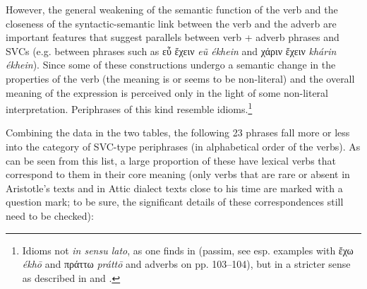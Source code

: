 \documentclass[output=paper,colorlinks,citecolor=brown]{langscibook}
\begin{document}
However, the general weakening of the semantic function of the verb and the closeness of the syntactic-semantic link between the verb and the adverb are important features that suggest parallels between verb + adverb phrases and SVCs (e.g. between phrases such as εὖ ἔχειν \textit{eũ ékhein} and χάριν ἔχειν \textit{khárin ékhein}). Since some of these constructions undergo a semantic change in the properties of the verb (the meaning is or seems to be non-literal) and the overall meaning of the expression is perceived only in the light of some non-literal interpretation. Periphrases of this kind resemble idioms.\footnote{Idioms not \textit{in sensu lato}, as one finds in \citet{Mastronarde2013} (passim, see esp. examples with ἔχω \textit{ékhō} and πράττω \textit{práttō} and adverbs on pp. 103--104), but in a stricter sense as described in \citet{Everaert2010} and \citet{Bruening2020}.}




Combining the data in the two tables, the following 23 phrases fall more or less into the category of SVC-type periphrases (in alphabetical order of the verbs). As can be seen from this list, a large proportion of these have lexical verbs that correspond to them in their core meaning (only verbs that are rare or absent in Aristotle’s texts and in Attic dialect texts close to his time are marked with a question mark; to be sure, the significant details of these correspondences still need to be checked): 
\end{document}
